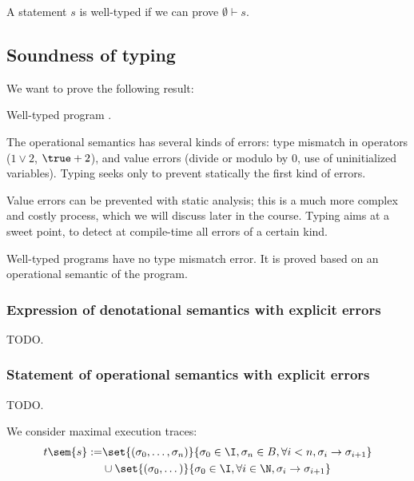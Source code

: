 \documentclass[toc, titlepaged]{../cs-classes/cs-classes}
\begin{document}
\begin{definition}
    A statement $s$ is well-typed if we can prove $\emptyset\vdash s$.
\end{definition}

\subsection{Soundness of typing}
We want to prove the following result:
\begin{theorem}
    Well-typed program .
\end{theorem}

The operational semantics has several kinds of errors: type mismatch in operators ($1\lor 2$, $\true+2$), and value errors (divide or modulo by 0, use of uninitialized variables). Typing seeks only to prevent statically the first kind of errors.

Value errors can be prevented with static analysis; this is a much more complex and costly process, which we will discuss later in the course. Typing aims at a sweet point, to detect at compile-time all errors of a certain kind.

\begin{property}[Soundness]
    Well-typed programs have no type mismatch error. It is proved based on an operational semantic of the program.
\end{property}

\subsubsection{Expression of denotational semantics with explicit errors}
TODO.

\subsubsection{Statement of operational semantics with explicit errors}
TODO.

\begin{definition}
    We consider maximal execution traces:
    \begin{equation*}
        \begin{aligned}
            t\sem{s} := &\set{(\sigma_0, \dots, \sigma_n)}{\sigma_0\in\I, \sigma_n\in B, \forall i<n, \sigma_i\to \sigma_{i+1}} \\& \cup \set{(\sigma_0, \dots)}{\sigma_0\in\I, \forall i\in\N, \sigma_i\to\sigma_{i+1}}
        \end{aligned}
    \end{equation*}
\end{definition}
\end{document}
